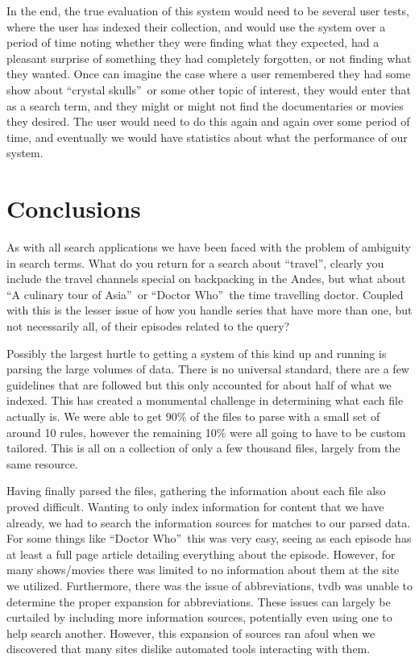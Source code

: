 \documentclass{acm_proc_article-sp}
\begin{document}
In the end, the true evaluation of this system would need to be several user tests, where the user has indexed their collection, and would use the system over a period of time noting whether they were finding what they expected, had a pleasant surprise of something they had completely forgotten, or not finding what they wanted.  Once can imagine the case where a user remembered they had some show about \textquotedblleft crystal skulls\textquotedblright\ or some other topic of interest, they would enter that as a search term, and they might or might not find the documentaries or movies they desired.  The user would need to do this again and again over some period of time, and eventually we would have statistics about what the performance of our system.


\section{Conclusions}
    As with all search applications we have been faced with the problem of ambiguity in search terms. What do you return for a search about \textquotedblleft travel\textquotedblright, clearly you include the travel channels special on backpacking in the Andes, but what about \textquotedblleft A culinary tour of Asia\textquotedblright\ or \textquotedblleft Doctor Who\textquotedblright\ the time travelling doctor. Coupled with this is the lesser issue of how you handle series that have more than one, but not necessarily all, of their episodes related to the query?

    Possibly the largest hurtle to getting a system of this kind up and running is parsing the large volumes of data. There is no universal standard, there are a few guidelines that are followed but this only accounted for about half of what we indexed. This has created a monumental challenge in determining what each file actually is. We were able to get 90\% of the files to parse with a small set of around 10 rules, however the remaining 10\% were all going to have to be custom tailored. This is all on a collection of only a few thousand files, largely from the same resource.

    Having finally parsed the files, gathering the information about each file also proved difficult. Wanting to only index information for content that we have already, we had to search the information sources for matches to our parsed data. For some things like \textquotedblleft Doctor Who\textquotedblright\ this was very easy, seeing as each episode has at least a full page article detailing everything about the episode. However, for many shows/movies there was limited to no information about them at the site we utilized. Furthermore, there was the issue of abbreviations, tvdb was unable to determine the proper expansion for abbreviations. These issues can largely be curtailed by including more information sources, potentially even using one to help search another. However, this expansion of sources ran afoul when we discovered that many sites dislike automated tools interacting with them.
\end{document}
